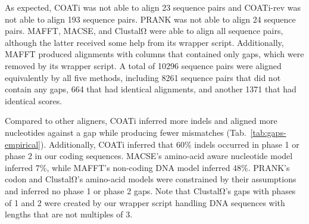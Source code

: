 \documentclass[12pt,letterpaper]{article}
\begin{document}
As expected, COATi was not able to align 23 sequence pairs and COATi-rev was not able to align 193 sequence pairs. PRANK was not able to align 24 sequence pairs. MAFFT, MACSE, and ClustalΩ were able to align all sequence pairs, although the latter received some help from its wrapper script. Additionally, MAFFT produced alignments with columns that contained only gaps, which were removed by its wrapper script.
A total of 10296 sequence pairs were aligned equivalently by all five methods, including 8261 sequence pairs that did not contain any gaps, 664 that had identical alignments, and another 1371 that had identical scores.

Compared to other aligners, COATi inferred more indels and aligned more nucleotides against a gap while producing fewer mismatches (Tab.~\ref{tab:gaps-empirical}). Additionally, COATi inferred that 60\% indels occurred in phase 1 or phase 2 in our coding sequences. MACSE's amino-acid aware nucleotide model inferred 7\%, while MAFFT's non-coding DNA model inferred 48\%. PRANK's codon and ClustalΩ's amino-acid models were constrained by their assumptions and inferred no phase 1 or phase 2 gaps. Note that ClustalΩ's gaps with phases of 1 and 2 were created by our wrapper script handling DNA sequences with lengths that are not multiples of 3.  
\end{document}
